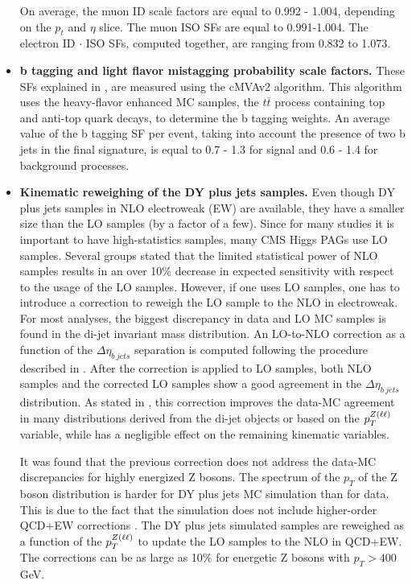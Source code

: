 \begin{small}
\begin{itemize}
On average, the muon ID scale factors are equal to 0.992 - 1.004, depending on the $p_t$ and $\eta$ slice. The muon ISO SFs are equal to 0.991-1.004. The electron ID $\cdot$ ISO SFs, computed together, are ranging from 0.832 to 1.073.

\item{\bfseries b tagging and light flavor mistagging probability scale factors.} 
These SFs explained in \label{sec:b_tagging}, are measured using the cMVAv2 algorithm. This algorithm uses the heavy-flavor enhanced MC samples, the $t\bar{t}$ process containing top and anti-top quark decays, to determine the b tagging weights. An average value of the b tagging SF per event, taking into account the presence of two b jets in the final signature, is equal to 0.7 - 1.3 for signal and 0.6 - 1.4 for background processes. 

\item{\bfseries Kinematic reweighing of the DY plus jets samples.} 
Even though DY plus jets samples in NLO electroweak (EW) are available, they have a smaller size than the LO samples (by a factor of a few). Since for many studies it is important to have high-statistics samples, many CMS Higgs PAGs use LO samples. Several groups stated that the limited statistical power of NLO samples results in an over 10\% decrease in expected sensitivity with respect to the usage of the LO samples. However, if one uses LO samples, one has to introduce a correction to reweigh the LO sample to the NLO in electroweak. For most analyses, the biggest discrepancy in data and LO MC samples is found in the di-jet invariant mass distribution. An LO-to-NLO correction as a function of the $\Delta \eta_{b\ jets}$ separation is computed following the procedure described in \cite{DYLOtoNLO}. After the correction is applied to LO samples, both NLO samples and the corrected LO samples show a good agreement in the $\Delta \eta_{b\ jets}$ distribution. As stated in \cite{DYLOtoNLO}, this correction improves the data-MC agreement in many distributions derived from the di-jet objects or based on the $p_T^{Z(\ell\ell)}$ variable, while has a negligible effect on the remaining kinematic variables.
  
It was found that the previous correction does not address the data-MC discrepancies for highly energized Z bosons. The spectrum of the $p_T$ of the Z boson distribution is harder for DY plus jets MC simulation than for data. This is due to the fact that the simulation does not include higher-order QCD+EW corrections \cite{NLO_Vjets}. The DY plus jets simulated samples are reweighed as a function of the $p_T^{Z(\ell\ell)}$ to update the LO samples to the NLO in QCD+EW. The corrections can be as large as 10\% for energetic Z bosons with $p_T > 400$ GeV.
\end{itemize}



\end{small}
